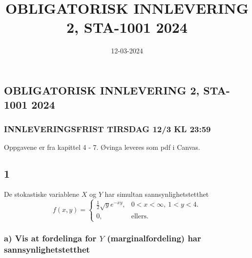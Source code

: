 \documentclass[
  12pt,
  a4paper,
  DIV=11,
  numbers=noendperiod]{scrartcl}
\title{OBLIGATORISK INNLEVERING 2, STA-1001 2024}
\author{}
\date{12-03-2024}
\renewcommand*\contentsname{Table of contents}
\newcommand\contentsname{Table of contents}
\begin{document}
\maketitle
\begin{abstract}
\hfill\break
\hfill\break
\hfill\break
\hfill\break
\hfill\break
\hfill\break
\hfill\break
\hfill\break
\hfill\break
\hfill\break
\hfill\break
\hfill\break
\hfill\break
\hfill\break
\hfill\break
\hfill\break
\hfill\break
\hfill\break
\hfill\break
\hfill\break
\hfill\break
\hfill\break
\hfill\break
\hfill\break
\hfill\break
\hfill\break
\hfill\break
\hfill\break
\hfill\break
\hfill\break
\hfill\break
\end{abstract}

\renewcommand*\contentsname{Innholdsfortegnelse}
{
\hypersetup{linkcolor=black}
\setcounter{tocdepth}{3}
\tableofcontents
}
\newpage

\subsection{OBLIGATORISK INNLEVERING 2, STA-1001
2024}\label{obligatorisk-innlevering-2-sta-1001-2024}

\subsubsection{INNLEVERINGSFRIST TIRSDAG 12/3 KL
23:59}\label{innleveringsfrist-tirsdag-123-kl-2359}

Oppgavene er fra kapittel 4 - 7. Øvinga leveres som pdf i Canvas.

\subsection{1}\label{section}

De stokastiske variablene \(X\) og \(Y\) har simultan
sannsynlighetstetthet \[
f(x,y) = 
\begin{cases}
\frac{1}{2} \sqrt y e^{-xy}, & 0 < x < \infty, \ 1 < y < 4. \\
0, & \text{ellers}.
\end{cases}
\]

\subsubsection{\texorpdfstring{a) Vis at fordelinga for \(Y\)
(marginalfordeling) har
sannsynlighetstetthet}{a) Vis at fordelinga for Y (marginalfordeling) har sannsynlighetstetthet}}\label{a-vis-at-fordelinga-for-y-marginalfordeling-har-sannsynlighetstetthet}
\end{document}
